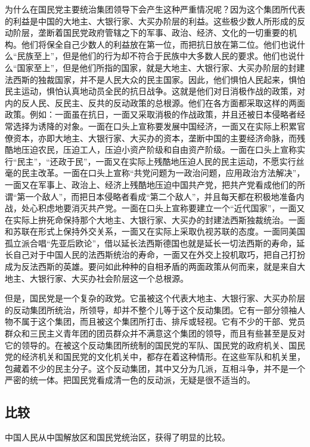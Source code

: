 为什么在国民党主要统治集团领导下会产生这种严重情况呢？因为这个集团所代表的利益是中国的大地主、大银行家、大买办阶层的利益。这些极少数人所形成的反动阶层，垄断着国民党政府管辖之下的军事、政治、经济、文化的一切重要的机构。他们将保全自己少数人的利益放在第一位，而把抗日放在第二位。他们也说什么“民族至上”，但是他们的行为却不符合于民族中大多数人民的要求。他们也说什么“国家至上”，但是他们所指的国家，就是大地主、大银行家、大买办阶层的封建法西斯的独裁国家，并不是人民大众的民主国家。因此，他们惧怕人民起来，惧怕民主运动，惧怕认真地动员全民的抗日战争。这就是他们对日消极作战的政策，对内的反人民、反民主、反共的反动政策的总根源。他们在各方面都采取这样的两面政策。例如：一面虽在抗日，一面又采取消极的作战政策，并且还被日本侵略者经常选择为诱降的对象。一面在口头上宣称要发展中国经济，一面又在实际上积累官僚资本，亦即大地主、大银行家、大买办的资本，垄断中国的主要经济命脉，而残酷地压迫农民，压迫工人，压迫小资产阶级和自由资产阶级。一面在口头上宣称实行“民主”，“还政于民”，一面又在实际上残酷地压迫人民的民主运动，不愿实行丝毫的民主改革。一面在口头上宣称“共党问题为一政治问题，应用政治方法解决”，一面又在军事上、政治上、经济上残酷地压迫中国共产党，把共产党看成他们的所谓“第一个敌人”，而把日本侵略者看成“第二个敌人”，并且每天都在积极地准备内战，处心积虑地要消灭共产党。一面在口头上宣称要建立一个“近代国家”，一面又在实际上拚死命保持那个大地主、大银行家、大买办的封建法西斯独裁统治。一面和苏联在形式上保持外交关系，一面又在实际上采取仇视苏联的态度。一面同美国孤立派合唱“先亚后欧论”，借以延长法西斯德国也就是延长一切法西斯的寿命，延长自己对于中国人民的法西斯统治的寿命，一面又在外交上投机取巧，把自己打扮成为反法西斯的英雄。要问如此种种的自相矛盾的两面政策从何而来，就是来自大地主、大银行家、大买办社会阶层这一个总根源。

但是，国民党是一个复杂的政党。它虽被这个代表大地主、大银行家、大买办阶层的反动集团所统治，所领导，却并不整个儿等于这个反动集团。它有一部分领袖人物不属于这个集团，而且被这个集团所打击、排斥或轻视。它有不少的干部、党员群众和三民主义青年团的团员群众并不满意这个集团的领导，而且有些甚至是反对它的领导的。在被这个反动集团所统制的国民党的军队、国民党的政府机关、国民党的经济机关和国民党的文化机关中，都存在着这种情形。在这些军队和机关里，包藏着不少的民主分子。这个反动集团，其中又分为几派，互相斗争，并不是一个严密的统一体。把国民党看成清一色的反动派，无疑是很不适当的。

\subsection{比较}

中国人民从中国解放区和国民党统治区，获得了明显的比较。

